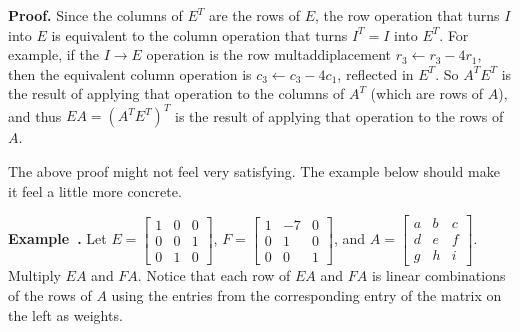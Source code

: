 \documentclass[11pt, letterpaper]{report}
\newenvironment{notes}{}{}
\newenvironment{book}{}{}
\newcounter{example}[section]
\newcommand{\example}{\refstepcounter{example}%
\par\noindent\textbf{Example~\theexample.} }
\begin{document}
\begin{notes}
\vfill
\end{notes}

\begin{book}
\textbf{Proof.} Since the columns of $E^T$ are the rows of $E$, the row operation that turns $I$ into $E$ is equivalent to the column operation that turns $I^T = I$  into $E^T$. For example, if the $I \rightarrow E$ operation is the row multaddiplacement $r_3\leftarrow r_3-4r_1$, then the equivalent column operation is $c_3\leftarrow c_3-4c_1$, reflected in $E^T$. So $A^TE^T$ is the result of applying that operation to the columns of $A^T$ (which are rows of $A$), and thus $EA = (A^TE^T)^T$ is the result of applying that operation to the rows of $A$. \blacksquare
\end{book}

The above proof might not feel very satisfying. The example below should make it feel a little more concrete.

\example {} Let $E = \begin{bmatrix}
1 & 0 & 0 \\
0 & 0 & 1 \\
0 & 1 & 0 
\end{bmatrix}$, $F = \begin{bmatrix}
1 & -7 & 0 \\
0 & 1 & 0 \\
0 & 0 & 1
\end{bmatrix}$, and $A = \begin{bmatrix}
a & b & c \\
d & e & f \\
g & h & i
\end{bmatrix}$. Multiply $EA$ and $FA$. Notice that each row of $EA$ and $FA$ is linear combinations of the rows of $A$ using the entries from the corresponding entry of the matrix on the left as weights.

\begin{notes}
\vfill
\newpage
\end{notes}
\end{document}
